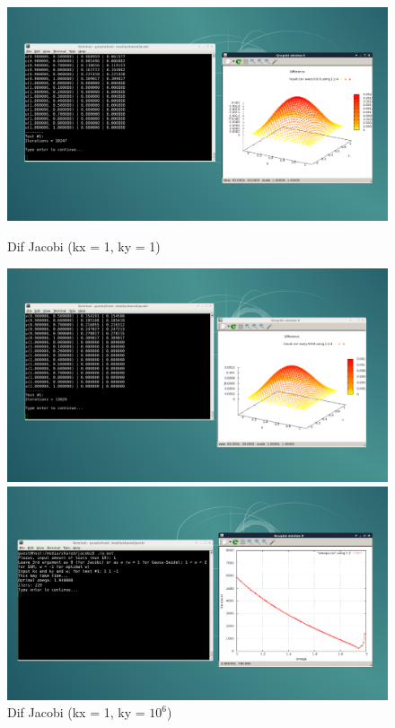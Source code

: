 \documentclass[a4paper, fleqn]{report}
\begin{document}
\begin{figure}[h]
\begin{minipage}{0.49\textwidth}
        \includegraphics[width=\textwidth]{media/dif_jacobi_1_1.png}
        \caption{Dif Jacobi (kx = 1, ky = 1)}
        \label{fig:dif_jacobi_1_1}
    \end{minipage}%
    \begin{minipage}{0.49\textwidth}
        \centering
        \includegraphics[width=\textwidth]{media/dif_jacobi_1_1000000.png}
        \caption{Dif Jacobi (kx = 1, ky = $10^6$)}
        \label{fig:dif_jacobi_1_1000000}
    \end{minipage}
    \par\bigskip
    \begin{minipage}{0.49\textwidth}
        \centering
        \includegraphics[width=\textwidth]{media/best_w_1_1.png}

\end{minipage}
\end{figure}
\end{document}
